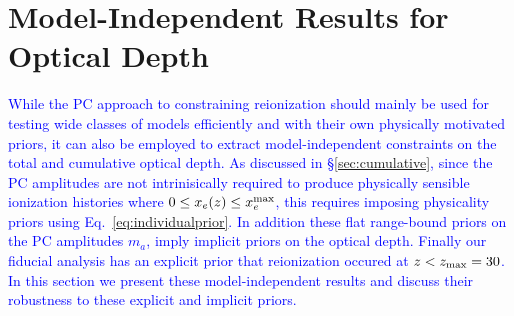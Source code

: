 \documentclass[prd,twocolumn,amsmath,amssymb,floatfix,superscriptaddress,nofootinbib]{revtex4-1}
\newcommand{\tauhi}{\tau_{\rm hi}}
\newcommand{\taulo}{\tau_{\rm lo}}
\newcommand{\wh}[1]{\textcolor{blue}{#1}}
\begin{document}

\section{Model-Independent Results for Optical Depth}

\wh{
While the PC approach to constraining reionization should mainly be used for 
testing wide classes of models efficiently and with their own physically motivated priors, it can also be employed to extract model-independent constraints on the total and cumulative optical depth.  As discussed in \S \ref{sec:cumulative}, since the PC amplitudes are not intrinisically required
to produce physically sensible ionization histories where $0 \le x_e(z) \le x_e^{\rm max}$, this requires imposing physicality priors using Eq.~\ref{eq:individualprior}.  In addition these flat range-bound priors on the PC amplitudes $m_a$, imply implicit priors on the optical depth.   
Finally our fiducial analysis has an explicit prior that reionization occured
at $z<z_{\rm max}=30$.   In this section we present these model-independent results and discuss their robustness to these explicit and implicit priors.
}




\end{document}

